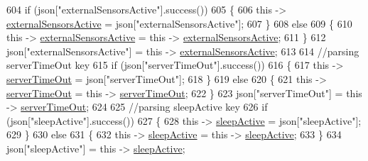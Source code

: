 \begin{DoxyCode}
604             \textcolor{keywordflow}{if} (json[\textcolor{stringliteral}{"externalSensorsActive"}].success())
605             \{
606                 \textcolor{keyword}{this} -> \hyperlink{classCoolBoard_a638b00b76aeb819ecfd4c10b8cdd7bb7}{externalSensorsActive} = json[\textcolor{stringliteral}{"externalSensorsActive"}];
607             \}
608             \textcolor{keywordflow}{else}
609             \{
610                 \textcolor{keyword}{this} -> \hyperlink{classCoolBoard_a638b00b76aeb819ecfd4c10b8cdd7bb7}{externalSensorsActive} = \textcolor{keyword}{this} -> 
      \hyperlink{classCoolBoard_a638b00b76aeb819ecfd4c10b8cdd7bb7}{externalSensorsActive};
611             \}
612             json[\textcolor{stringliteral}{"externalSensorsActive"}] = \textcolor{keyword}{this} -> \hyperlink{classCoolBoard_a638b00b76aeb819ecfd4c10b8cdd7bb7}{externalSensorsActive};
613 
614             \textcolor{comment}{//parsing serverTimeOut key}
615             \textcolor{keywordflow}{if} (json[\textcolor{stringliteral}{"serverTimeOut"}].success())
616             \{
617                 \textcolor{keyword}{this} -> \hyperlink{classCoolBoard_a7a8d8d3d316220cdd049cd63c1aa8fe6}{serverTimeOut} = json[\textcolor{stringliteral}{"serverTimeOut"}];
618             \}
619             \textcolor{keywordflow}{else}
620             \{
621                 \textcolor{keyword}{this} -> \hyperlink{classCoolBoard_a7a8d8d3d316220cdd049cd63c1aa8fe6}{serverTimeOut} = \textcolor{keyword}{this} -> \hyperlink{classCoolBoard_a7a8d8d3d316220cdd049cd63c1aa8fe6}{serverTimeOut};
622             \}
623             json[\textcolor{stringliteral}{"serverTimeOut"}] = \textcolor{keyword}{this} -> \hyperlink{classCoolBoard_a7a8d8d3d316220cdd049cd63c1aa8fe6}{serverTimeOut};
624             
625             \textcolor{comment}{//parsing sleepActive key}
626             \textcolor{keywordflow}{if} (json[\textcolor{stringliteral}{"sleepActive"}].success())
627             \{
628                 \textcolor{keyword}{this} -> \hyperlink{classCoolBoard_a0a51b2287139f66c738101fb53139230}{sleepActive} = json[\textcolor{stringliteral}{"sleepActive"}];
629             \}
630             \textcolor{keywordflow}{else}
631             \{
632                 \textcolor{keyword}{this} -> \hyperlink{classCoolBoard_a0a51b2287139f66c738101fb53139230}{sleepActive} = \textcolor{keyword}{this} -> \hyperlink{classCoolBoard_a0a51b2287139f66c738101fb53139230}{sleepActive};
633             \}
634             json[\textcolor{stringliteral}{"sleepActive"}] = \textcolor{keyword}{this} -> \hyperlink{classCoolBoard_a0a51b2287139f66c738101fb53139230}{sleepActive};

\end{DoxyCode}
